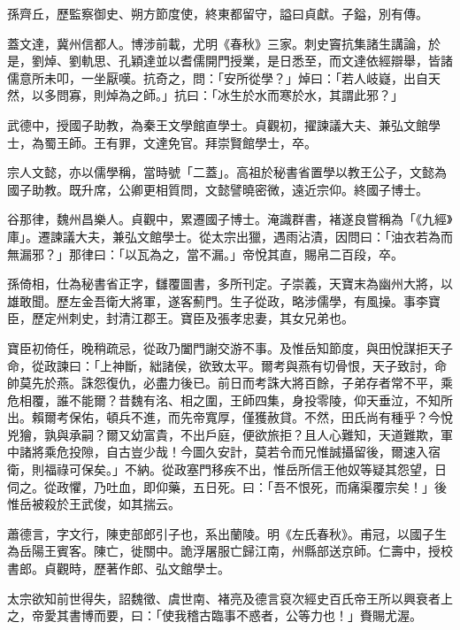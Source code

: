 \begin{pinyinscope}
 孫齊丘，歷監察御史、朔方節度使，終東都留守，謚曰貞獻。子鎰，別有傳。



 蓋文達，冀州信都人。博涉前載，尤明《春秋》三家。刺史竇抗集諸生講論，於是，劉焯、劉軌思、孔穎達並以耆儒開門授業，是日悉至，而文達依經辯舉，皆諸儒意所未叩，一坐厭嘆。抗奇之，問：「安所從學？」焯曰：「若人岐嶷，出自天然，以多問寡，則焯為之師。」抗曰：「冰生於水而寒於水，其謂此邪？」



 武德中，授國子助教，為秦王文學館直學士。貞觀初，擢諫議大夫、兼弘文館學士，為蜀王師。王有罪，文達免官。拜崇賢館學士，卒。



 宗人文懿，亦以儒學稱，當時號「二蓋」。高祖於秘書省置學以教王公子，文懿為國子助教。既升席，公卿更相質問，文懿譬曉密微，遠近宗仰。終國子博士。



 谷那律，魏州昌樂人。貞觀中，累遷國子博士。淹識群書，褚遂良嘗稱為「《九經》庫」。遷諫議大夫，兼弘文館學士。從太宗出獵，遇雨沾漬，因問曰：「油衣若為而無漏邪？」那律曰：「以瓦為之，當不漏。」帝悅其直，賜帛二百段，卒。



 孫倚相，仕為秘書省正字，讎覆圖書，多所刊定。子崇義，天寶末為幽州大將，以雄敢聞。歷左金吾衛大將軍，遂客薊門。生子從政，略涉儒學，有風操。事李寶臣，歷定州刺史，封清江郡王。寶臣及張孝忠妻，其女兄弟也。



 寶臣初倚任，晚稍疏忌，從政乃闔門謝交游不事。及惟岳知節度，與田悅謀拒天子命，從政諫曰：「上神斷，絀諸侯，欲致太平。爾考與燕有切骨恨，天子致討，命帥莫先於燕。誅怨復仇，必盡力後已。前日而考誅大將百餘，子弟存者常不平，乘危相覆，誰不能爾？昔魏有洺、相之圍，王師四集，身投零陵，仰天垂泣，不知所出。賴爾考保佑，頓兵不進，而先帝寬厚，僅獲赦貸。不然，田氏尚有種乎？今悅兇獪，孰與承嗣？爾又幼富貴，不出戶庭，便欲旅拒？且人心難知，天道難欺，軍中諸將乘危投隙，自古豈少哉！今圖久安計，莫若令而兄惟誠攝留後，爾速入宿衛，則福祿可保矣。」不納。從政塞門移疾不出，惟岳所信王他奴等疑其怨望，日伺之。從政懼，乃吐血，即仰藥，五日死。曰：「吾不恨死，而痛渠覆宗矣！」後惟岳被殺於王武俊，如其揣云。



 蕭德言，字文行，陳吏部郎引子也，系出蘭陵。明《左氏春秋》。甫冠，以國子生為岳陽王賓客。陳亡，徙關中。詭浮屠服亡歸江南，州縣部送京師。仁壽中，授校書郎。貞觀時，歷著作郎、弘文館學士。



 太宗欲知前世得失，詔魏徵、虞世南、褚亮及德言裒次經史百氏帝王所以興衰者上之，帝愛其書博而要，曰：「使我稽古臨事不惑者，公等力也！」賚賜尤渥。




\end{pinyinscope}
